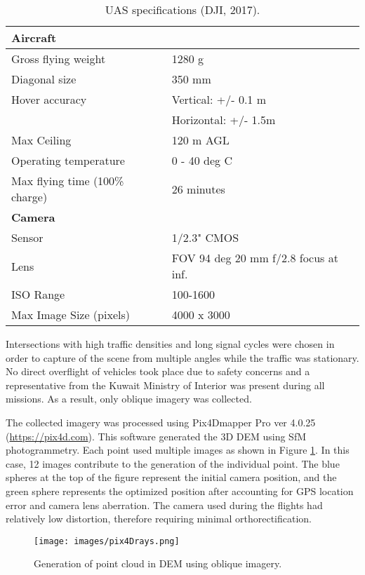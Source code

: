 \begin{table}[H]
\centering
\caption{UAS specifications (DJI, 2017).}
\label{tb:p3p-specs}
\begin{tabular}{@{}ll@{}}
\hline
\textbf{Aircraft} &  \\ \hline
Gross flying weight & 1280 g \\
Diagonal size & 350 mm \\
Hover accuracy & Vertical: +/- 0.1 m \\
 & Horizontal: +/- 1.5m \\
Max Ceiling & 120 m AGL \\
Operating temperature & 0 - 40 deg C \\
Max flying time (100\% charge) & 26 minutes \\ \hline
\textbf{Camera} &  \\ \hline
Sensor & 1/2.3" CMOS \\
Lens & FOV 94 deg 20 mm f/2.8 focus at inf. \\
ISO Range & 100-1600 \\
Max Image Size (pixels) & 4000 x 3000 \\ \hline
\end{tabular}
\end{table}

Intersections with high traffic densities and long signal cycles were chosen in order to capture of the scene from multiple angles while the traffic was stationary. No direct overflight of vehicles took place due to safety concerns and a representative from the Kuwait Ministry of Interior was present during all missions. As a result, only oblique imagery was collected. 

The collected imagery was processed using Pix4Dmapper Pro ver 4.0.25 (\url{https://pix4d.com}). This software generated the 3D DEM using SfM photogrammetry. Each point used multiple images as shown in Figure \ref{fig:pix4Drays}. In this case, 12 images contribute to the generation of the individual point. The blue spheres at the top of the figure represent the initial camera position, and the green sphere represents the optimized position after accounting for GPS location error and camera lens aberration. The camera used during the flights had relatively low distortion, therefore requiring minimal orthorectification.
%
\begin{figure}[H]
\centering
\texttt{[image: images/pix4Drays.png]} 
\caption{Generation of point cloud in DEM using oblique imagery.}
\label{fig:pix4Drays}
\end{figure}
%

